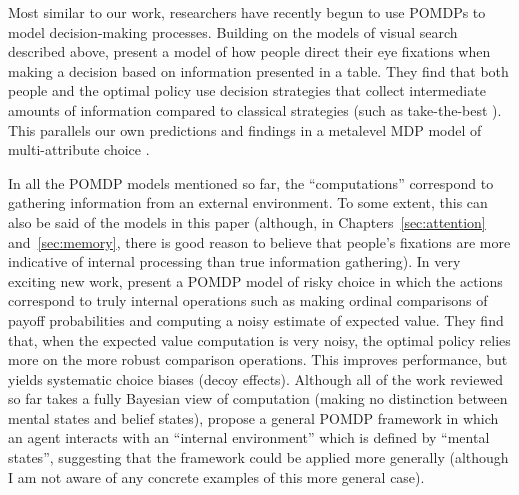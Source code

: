 Most similar to our work, researchers have recently begun to use POMDPs to model decision-making processes. Building on the models of visual search described above, \citet{chen2017cognitive} present a model of how people direct their eye fixations when making a decision based on information presented in a table. They find that both people and the optimal policy use decision strategies that collect intermediate amounts of information compared to classical strategies (such as take-the-best \citealp{gigerenzer1996reasoning}). This parallels our own predictions and findings in a metalevel MDP model of multi-attribute choice \citep{gul2018discovering}.

In all the POMDP models mentioned so far, the ``computations'' correspond to gathering information from an external environment. To some extent, this can also be said of the models in this paper (although, in Chapters~\ref{sec:attention} and~\ref{sec:memory}, there is good reason to believe that people's fixations are more indicative of internal processing than true information gathering). In very exciting new work, \citet{chen2021apparently} present a POMDP model of risky choice in which the actions correspond to truly internal operations such as making ordinal comparisons of payoff probabilities and computing a noisy estimate of expected value. They find that, when the expected value computation is very noisy, the optimal policy relies more on the more robust comparison operations. This improves performance, but yields systematic choice biases (decoy effects). Although all of the work reviewed so far takes a fully Bayesian view of computation (making no distinction between mental states and belief states), \citet{oulasvirta2022computational} propose a general POMDP framework in which an agent interacts with an ``internal environment'' which is defined by ``mental states'', suggesting that the framework could be applied more generally (although I am not aware of any concrete examples of this more general case).

